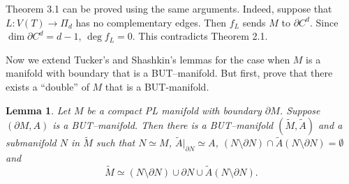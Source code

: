 \documentclass[a4paper,12pt]{article}
\newtheorem{lemma}{Lemma}[section]
\begin{document}
 Theorem 3.1 can be proved using the same arguments. Indeed, suppose that $L:V(T)\to \Pi_d$  has no complementary edges. Then $f_L$ sends $M$ to $\partial C^d$. Since $\dim{\partial C^d}=d-1$, $\deg{f_L}=0$. This contradicts Theorem 2.1.

\medskip

Now we extend Tucker's and Shashkin's lemmas for the case when $M$ is a manifold with boundary that is a BUT--manifold.  But first, prove that there exists a ``double'' of $M$ that is a BUT-manifold.




\begin{lemma} \label{Lemma1}  Let $M$ be a compact PL manifold with boundary $\partial M$. Suppose  $(\partial M,A)$ is a BUT--manifold. Then there is a BUT--manifold $(\tilde M,\tilde A)$ and a submanifold $N$ in $\tilde M$  such that  $N\simeq M$, $\tilde A|_{\partial N}\simeq A$, $ (N\setminus\partial N) \cap \tilde A(N\setminus\partial N)=\emptyset$ and
$$\tilde M\simeq (N\setminus\partial N)\cup \partial N \cup \tilde A(N\setminus\partial N).$$
\end{lemma}
\end{document}
